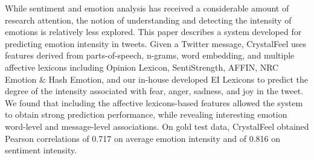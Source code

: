 While sentiment and emotion analysis has received a considerable amount of research attention, the notion of understanding and detecting the intensity of emotions is relatively less explored. This paper describes a system developed for predicting emotion intensity in tweets. Given a Twitter message, CrystalFeel uses features derived from parts-of-speech, n-grams, word embedding, and multiple affective lexicons including Opinion Lexicon, SentiStrength, AFFIN, NRC Emotion \& Hash Emotion, and our in-house developed EI Lexicons to predict the degree of the intensity associated with fear, anger, sadness, and joy in the tweet. We found that including the affective lexicons-based features allowed the system to obtain strong prediction performance, while revealing interesting emotion word-level and message-level associations. On gold test data, CrystalFeel obtained Pearson correlations of 0.717 on average emotion intensity and of 0.816 on sentiment intensity.
